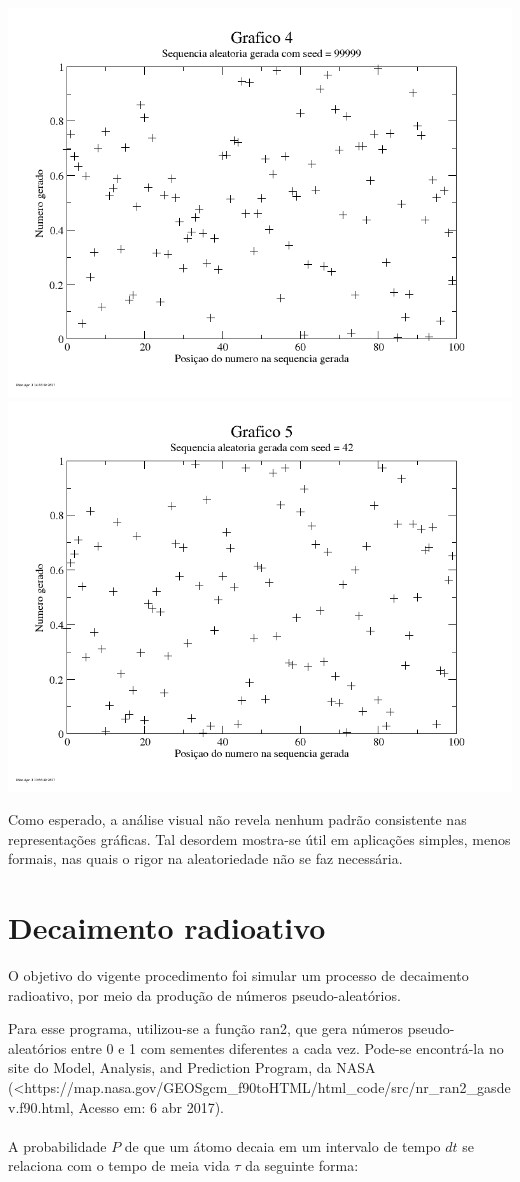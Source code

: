 \documentclass{article}
\begin{document}
\includegraphics[width=\textwidth]{graf4}
\includegraphics[width=\textwidth]{graf5}

Como esperado, a análise visual não revela nenhum padrão consistente nas representações gráficas. Tal desordem mostra-se útil em aplicações simples, menos formais, nas quais o rigor na aleatoriedade não se faz necessária.

\section{Decaimento radioativo}
O objetivo do vigente procedimento foi simular um processo de decaimento radioativo, por meio da produção de números pseudo-aleatórios.\par
Para esse programa, utilizou-se a função ran2, que gera números pseudo-aleatórios entre 0 e 1 com sementes diferentes a cada vez. Pode-se encontrá-la no site do Model, Analysis, and Prediction Program, da NASA (<https://map.nasa.gov/GEOSgcm_f90toHTML/html_code/src/nr_ran2_gasdev.f90.html\>, Acesso em: 6 abr 2017).\paragraph{}
A probabilidade $P$ de que um átomo decaia em um intervalo de tempo $dt$ se relaciona com o tempo de meia vida $\tau$ da seguinte forma:
\end{document}
